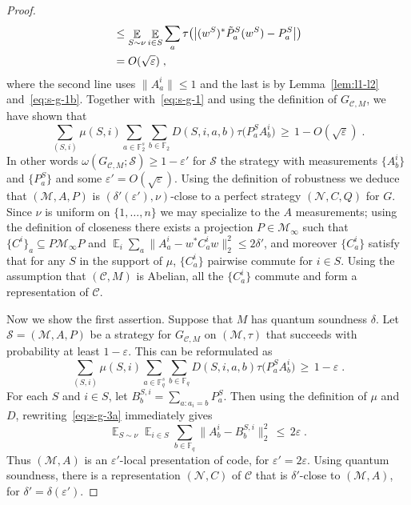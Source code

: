 \documentclass[11pt]{article}
\theoremstyle{definition}
\newcommand{\code}{\mathcal{C}}
\newcommand{\strategy}{\mathscr{S}}
\DeclareMathOperator*{\Expectation}{\mathbb{E}}
\newcommand{\Es}[1]{\Expectation_{#1}}
\newcommand{\field}{\mathbb{F}_2}
\newcommand{\F}{\ensuremath{\mathbb{F}}}
\newcommand{\mM}{\ensuremath{\mathcal{M}}}
\newcommand{\eps}{\varepsilon}
\newcommand{\mN}{\mathcal{N}}
\begin{document}
\begin{proof}
\begin{align}
&\leq \Es{S\sim \nu} \Es{i\in S} \sum_a \tau\big(\big|(w^S)^* \tilde{P}^S_a (w^S)-P^S_a\big|\big)\notag\\
&= O(\sqrt{\eps})\;,\label{eq:s-g-2}
\end{align}
where the second line uses $\|A^i_a\|\leq 1$ and the last is by Lemma~\ref{lem:l1-l2} and~\eqref{eq:s-g-1b}.
Together with~\eqref{eq:s-g-1} and using the definition of $G_{\code,M}$, we have shown that
\begin{equation}
 \sum_{(S,i)} \mu(S,i) \sum_{a\in \field^s}\sum_{b\in\field} D(S,i,a,b) \tau\big(  P^S_a  A^i_{b}\big) \,\geq \,1-O(\sqrt{\eps})\;.\label{eq:s-g-4}
\end{equation}
In other words $\omega(G_{\code,M};\strategy)\geq 1-\eps'$ for $\strategy$ the strategy with measurements $\{A^i_b\}$ and $\{P^{S}_a\}$ and some $\eps'=O(\sqrt{\eps})$. Using the definition of robustness we deduce that $(\mM,A,P)$ is $(\delta'(\eps'),\nu)$-close to a perfect strategy $(\mN,C,Q)$ for $G$. Since $\nu$ is uniform on $\{1,\ldots,n\}$ we may specialize to the $A$ measurements; using the definition of closeness there exists a projection $P\in \mM_\infty$ such that $\{C^i\}_a \subseteq P\mM_\infty P$ and $\Es{i}\sum_a \|A^i_a-w^* C^i_a w \|_2^2 \leq 2\delta'$, and moreover $\{C^i_a\}$ satisfy that for any $S$ in the support of $\mu$, $\{C^i_a\}$ pairwise commute for $i\in S$. Using the assumption that $(\code,M)$ is Abelian, all the $\{C^i_a\}$ commute and form a representation of $\code$.

Now we show the first assertion. Suppose that $M$ has quantum soundness $\delta$.
Let $\strategy=(\mM,A,P)$ be a strategy for $G_{\code,M}$ on $(\mM,\tau)$ that succeeds with probability at least $1-\eps$. This can be reformulated as 
\begin{equation}
 \sum_{(S,i)} \mu(S,i) \sum_{a\in \F_q^s}\sum_{b\in\F_q} D(S,i,a,b) \tau\big(  P^S_a  A^i_{b}\big) \,\geq \,1-\eps\;.\label{eq:s-g-3a}
\end{equation}
For each $S$ and $i\in S$, let $B^{S,i}_b = \sum_{a:a_i=b} P^S_a$. Then using the definition of $\mu$ and $D$, rewriting~\eqref{eq:s-g-3a} immediately gives
\begin{equation}
 \Es{S\sim \nu} \Es{i\in S} \sum_{b\in\F_q} \big\| A^i_{b} - B^{S,i}_b\big\|_2^2 \,\leq \,2\eps\;.\label{eq:s-g-3}
\end{equation}
Thus $(\mM,A)$ is an $\eps'$-local presentation of code, for $\eps'=2\eps$. Using quantum soundness, there is a representation $(\mN,C)$ of $\code$ that is $\delta'$-close to $(\mM,A)$, for $\delta'=\delta(\eps')$. 


\end{proof}
\end{document}
